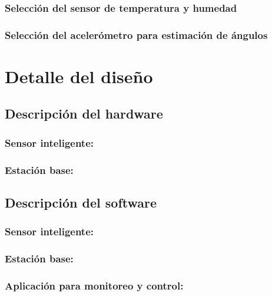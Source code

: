 \subsubsection{Selección del sensor de temperatura y humedad}
\subsubsection{Selección del acelerómetro para estimación de ángulos}

\section{Detalle del diseño}

\subsection{Descripción del hardware}

\subsubsection{Sensor inteligente:}

\subsubsection{Estación base:}

\subsection{Descripción del software}

\subsubsection{Sensor inteligente:}

\subsubsection{Estación base:}

\subsubsection{Aplicación para monitoreo y control:}